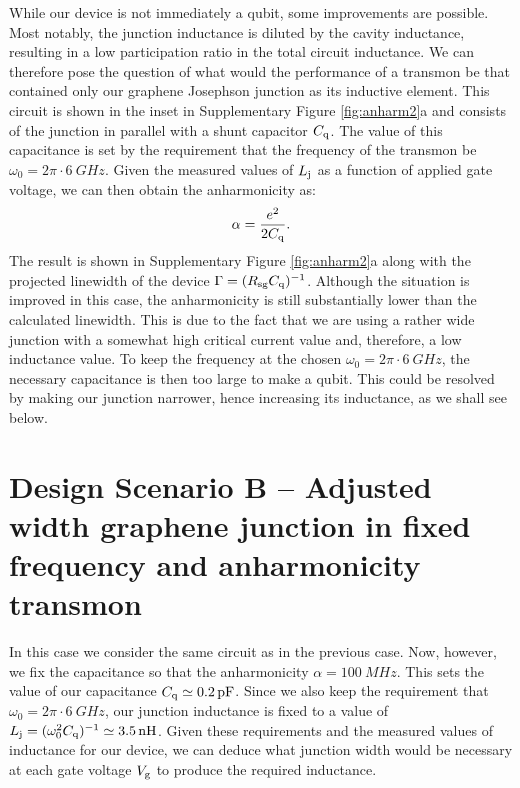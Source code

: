 \documentclass[preprint,
  onecolumn,
  notitlepage,
  amsmath,amssymb,
  aip,
  apl,
]{revtex4-1}
\begin{document}
While our device is not immediately a qubit, some improvements are possible.
Most notably, the junction inductance is diluted by the cavity inductance, resulting in a low participation ratio in the total circuit inductance.
We can therefore pose the question of what would the performance of a transmon be that contained only our graphene Josephson junction as its inductive element.
This circuit is shown in the inset in Supplementary Figure \ref{fig:anharm2}a and consists of the junction in parallel with a shunt capacitor $C_{\rm q}$.
The value of this capacitance is set by the requirement that the frequency of the transmon be $\omega_0 = 2\pi\cdot\SI{6}{GHz}$.
Given the measured values of $L_{\rm j}$ as a function of applied gate voltage, we can then obtain the anharmonicity as:
\begin{equation}
\alpha = \frac{e^2}{2C_{\rm q}}.
\end{equation}
The result is shown in Supplementary Figure \ref{fig:anharm2}a along with the projected linewidth of the device $\Gamma = (R_{\rm sg}C_{\rm q})^{-1}$.
Although the situation is improved in this case, the anharmonicity is still substantially lower than the calculated linewidth.
This is due to the fact that we are using a rather wide junction with a somewhat high critical current value and, therefore, a low inductance value.
To keep the frequency at the chosen $\omega_0 = 2\pi\cdot\SI{6}{GHz}$, the necessary capacitance is then too large to make a qubit.
This could be resolved by making our junction narrower, hence increasing its inductance, as we shall see below.

    

\section{Design Scenario B -- Adjusted width graphene junction in fixed frequency and anharmonicity transmon}\label{sec:scenB}

In this case we consider the same circuit as in the previous case.
Now, however, we fix the capacitance so that the anharmonicity $\alpha = \SI{100}{MHz}$.
This sets the value of our capacitance $C_{\rm q}\simeq\SI{0.2}{pF}$.
Since we also keep the requirement that $\omega_0 = 2\pi\cdot\SI{6}{GHz}$, our junction inductance is fixed to a value of $L_{\rm j} = (\omega_0^2C_{\rm q})^{-1} \simeq \SI{3.5}{nH}$.  
Given these requirements and the measured values of inductance for our device, we can deduce what junction width would be necessary at each gate voltage $V_{\rm g}$ to produce the required inductance.
\end{document}
